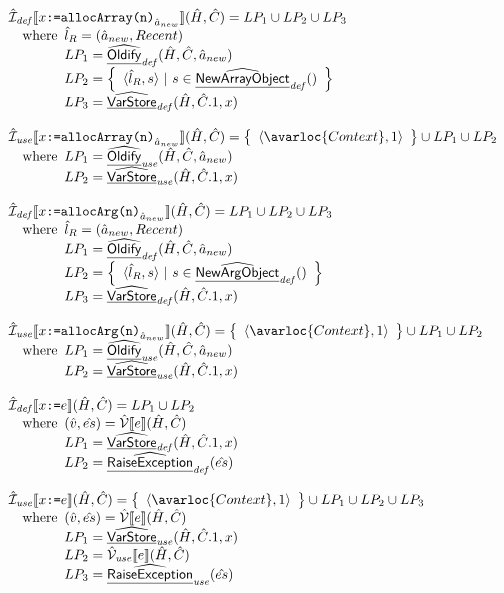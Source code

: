 \[
\begin{array}{l}
  \aI_{\it def}\lbr x\TT{:=}\TT{allocArray(n)}_{\hat{a}_{new}}\rbr(\hat{H},\hat{C})
  = LP_1 \cup LP_2 \cup LP_3\\
  \quad\wherec{
    \hat{l}_R = (\hat{a}_{new},Recent)\\
    LP_1 = \ahf{Oldify}_{\it def}(\hat{H}, \hat{C}, \hat{a}_{new}) \\
    LP_2 = \set{\langle \hat{l}_R, s \rangle ~|~ s \in \ahf{NewArrayObject}_{\it def}() } \\
    LP_3 = \ahf{VarStore}_{\it def}(\hat{H}, \hat{C}.1, x)\\
  }
  \\\\
  \aI_{\it use}\lbr x\TT{:=}\TT{allocArray(n)}_{\hat{a}_{new}}\rbr(\hat{H},\hat{C})
  = \set{\langle \avarloc{Context}, 1\rangle} \cup LP_1 \cup LP_2\\
  \quad\wherec{
    LP_1 = \ahf{Oldify}_{\it use}(\hat{H}, \hat{C}, \hat{a}_{new}) \\
    LP_2 = \ahf{VarStore}_{\it use}(\hat{H}, \hat{C}.1, x)
  }
  \\\\
  \aI_{\it def}\lbr x\TT{:=}\TT{allocArg(n)}_{\hat{a}_{new}}\rbr(\hat{H},\hat{C})
  = LP_1 \cup LP_2 \cup LP_3 \\
  \quad\wherec{
    \hat{l}_R = (\hat{a}_{new},Recent)\\
    LP_1 = \ahf{Oldify}_{\it def}(\hat{H}, \hat{C}, \hat{a}_{new}) \\
    LP_2 = \set{\langle \hat{l}_R, s \rangle ~|~ s \in \ahf{NewArgObject}_{\it def}() } \\
    LP_3 = \ahf{VarStore}_{\it def}(\hat{H}, \hat{C}.1, x)
  }
  \\\\
  \aI_{\it use}\lbr x\TT{:=}\TT{allocArg(n)}_{\hat{a}_{new}}\rbr(\hat{H},\hat{C})
  = \set{\langle \avarloc{Context}, 1\rangle} \cup LP_1 \cup LP_2\\
  \quad\wherec{
    LP_1 = \ahf{Oldify}_{\it use}(\hat{H}, \hat{C}, \hat{a}_{new}) \\
    LP_2 = \ahf{VarStore}_{\it use}(\hat{H}, \hat{C}.1, x)
  }
  \\\\
  \aI_{\it def}\lbr x\TT{:=}e\rbr(\hat{H},\hat{C})
  = LP_1 \cup LP_2\\
  \quad\wherec{
    (\hat{v},\hat{es}) = \aV\lbr e\rbr(\hat{H},\hat{C})\\
    LP_1 = \ahf{VarStore}_{\it def}(\hat{H}, \hat{C}.1, x)\\
    LP_2 = \ahf{RaiseException}_{\it def}(\hat{es})
  }
  \\\\
  \aI_{\it use}\lbr x\TT{:=}e\rbr(\hat{H},\hat{C})
  = \set{\langle \avarloc{Context}, 1\rangle} \cup LP_1 \cup LP_2 \cup LP_3\\
  \quad\wherec{
    (\hat{v},\hat{es}) = \aV\lbr e\rbr(\hat{H},\hat{C})\\
    LP_1 = \ahf{VarStore}_{\it use}(\hat{H}, \hat{C}.1, x)\\
    LP_2 = \aV_{\it use}\lbr e\rbr(\hat{H},\hat{C})\\
    LP_3 = \ahf{RaiseException}_{\it use}(\hat{es})
  }
\end{array}
\]
